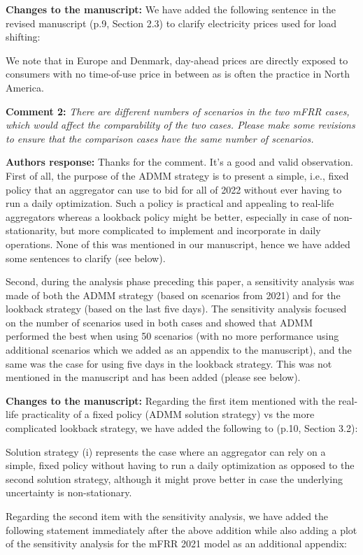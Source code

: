 \documentclass[10pt]{article}
\newcommand{\nt}[1]{\textcolor{newtextcolor}{#1}}
\newcommand{\auth}{\textbf{Authors response: }}
\newcommand{\changes}{\textbf{Changes to the manuscript: }}
\begin{document}
\changes We have added the following sentence in the revised manuscript (p.9, Section 2.3) to clarify electricity prices used for load shifting:

\nt{We note that in Europe and Denmark, day-ahead prices are directly exposed to consumers with no time-of-use price in between as is often the practice in North America.}

\textbf{Comment 2:} \textit{There are different numbers of scenarios in the two mFRR cases, which would affect the comparability of the two cases. Please make some revisions to ensure that the comparison cases have the same number of scenarios.}

\auth Thanks for the comment. It's a good and valid observation. First of all, the purpose of the ADMM strategy is to present a simple, i.e., fixed policy that an aggregator can use to bid for all of 2022 without ever having to run a daily optimization. Such a policy is practical and appealing to real-life aggregators whereas a lookback policy might be better, especially in case of non-stationarity, but more complicated to implement and incorporate in daily operations. None of this was mentioned in our manuscript, hence we have added some sentences to clarify (see below).

Second, during the analysis phase preceding this paper, a sensitivity analysis was made of both the ADMM strategy (based on scenarios from 2021) and for the lookback strategy (based on the last five days). The sensitivity analysis focused on the number of scenarios used in both cases and showed that ADMM performed the best when using 50 scenarios (with no more performance using additional scenarios which we added as an appendix to the manuscript), and the same was the case for using five days in the lookback strategy. This was not mentioned in the manuscript and has been added (please see below).

\changes Regarding the first item mentioned with the real-life practicality of a fixed policy (ADMM solution strategy) vs the more complicated lookback strategy, we have added the following to (p.10, Section 3.2):

\nt{Solution strategy (i) represents the case where an aggregator can rely on a simple, fixed policy without having to run a daily optimization as opposed to the second solution strategy, although it might prove better in case the underlying uncertainty is non-stationary.}

Regarding the second item with the sensitivity analysis, we have added the following statement immediately after the above addition while also adding a plot of the sensitivity analysis for the mFRR 2021 model as an additional appendix:
\end{document}
